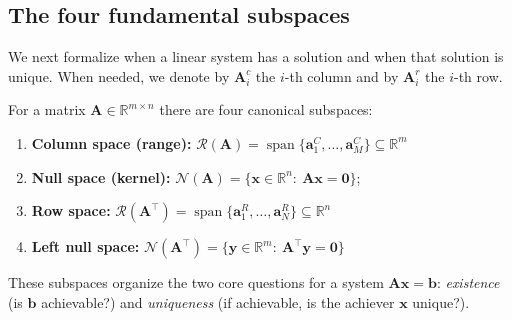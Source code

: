 \subsection{The four fundamental subspaces}
We next formalize when a linear system has a solution and when that solution is unique. When needed, we denote by $\mathbf{A}_i^c$ the $i$-th column and by $\mathbf{A}_i^r$ the $i$-th row.

For a matrix $\mathbf{A}\in\mathbb{R}^{m\times n}$ there are four canonical subspaces:
\begin{enumerate}
    \item \textbf{Column space (range):} $\displaystyle \mathcal{R}(\mathbf{A})=\operatorname{span}\{\mathbf{a}^C_1,\dots,\mathbf{a}^C_M\}\subseteq\mathbb{R}^m$
    \item \textbf{Null space (kernel):} $\displaystyle \mathcal{N}(\mathbf{A})=\{\mathbf{x}\in\mathbb{R}^n:\ \mathbf{A}\mathbf{x}=\mathbf{0}\}$;
    \item \textbf{Row space:} $\displaystyle \mathcal{R}(\mathbf{A}^{\top})=\operatorname{span}\{\mathbf{a}^R_1,\dots,\mathbf{a}^R_N\}\subseteq\mathbb{R}^n$
    \item \textbf{Left null space:} $\displaystyle \mathcal{N}(\mathbf{A}^{\top})=\{\mathbf{y}\in\mathbb{R}^m:\ \mathbf{A}^{\top}\mathbf{y}=\mathbf{0}\}$
\end{enumerate}
These subspaces organize the two core questions for a system $\mathbf{A}\mathbf{x}=\mathbf{b}$: \emph{existence} (is $\mathbf{b}$ achievable?) and \emph{uniqueness} (if achievable, is the achiever $\mathbf{x}$ unique?). 

